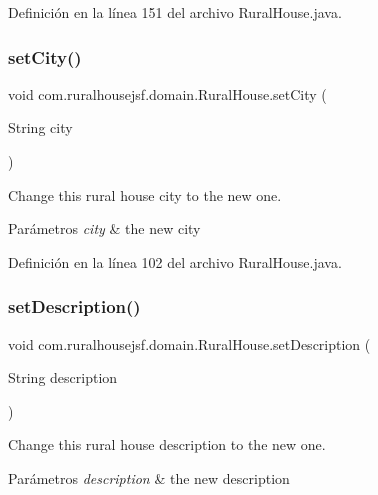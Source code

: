 Definición en la línea 151 del archivo Rural\+House.\+java.

\mbox{\label{classcom_1_1ruralhousejsf_1_1domain_1_1_rural_house_a329be3e41ca6f9e57a0fc887c066ad55}} 
\subsubsection{\texorpdfstring{setCity()}{setCity()}}
{\footnotesize\ttfamily void com.\+ruralhousejsf.\+domain.\+Rural\+House.\+set\+City (\begin{DoxyParamCaption}\item[{String}]{city }\end{DoxyParamCaption})}

Change this rural house city to the new one.


\begin{DoxyParams}{Parámetros}
{\em city} & the new city \\
\hline
\end{DoxyParams}


Definición en la línea 102 del archivo Rural\+House.\+java.

\mbox{\label{classcom_1_1ruralhousejsf_1_1domain_1_1_rural_house_ad4e39275d6996833e089c2013bfb9c4b}} 
\subsubsection{\texorpdfstring{setDescription()}{setDescription()}}
{\footnotesize\ttfamily void com.\+ruralhousejsf.\+domain.\+Rural\+House.\+set\+Description (\begin{DoxyParamCaption}\item[{String}]{description }\end{DoxyParamCaption})}

Change this rural house description to the new one.


\begin{DoxyParams}{Parámetros}
{\em description} & the new description \\
\hline
\end{DoxyParams}


